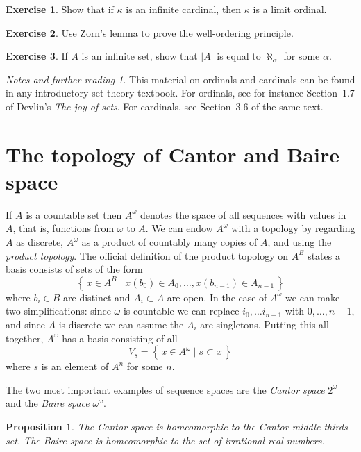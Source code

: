 \documentclass[11pt,oneside]{amsbook}
\newcommand{\set}[1]{\left\{\,#1\,\right\}}
\theoremstyle{definition}
\newtheorem{exercise}{Exercise}[section]
\theoremstyle{plain}
\newtheorem{proposition}[theorem]{Proposition}
\theoremstyle{definition}
\theoremstyle{remark}
\newtheorem*{notes}{Notes and further reading}
\numberwithin{equation}{section}
\numberwithin{figure}{section}
\begin{document}
\begin{exercise}
  Show that if $\kappa$ is an infinite cardinal, then $\kappa$ is a limit ordinal.
\end{exercise}

\begin{exercise}
  Use Zorn's lemma to prove the well-ordering principle.
\end{exercise}

\begin{exercise}
  If $A$ is an infinite set, show that $|A|$ is equal to $\aleph_\alpha$ for some $\alpha$.
\end{exercise}

\begin{notes}
  This material on ordinals and cardinals can be found in any introductory set theory textbook. For ordinals, see for instance Section~1.7 of Devlin's \emph{The joy of sets}. For cardinals, see Section~3.6 of the same text.
\end{notes}


\newpage
\section{The topology of Cantor and Baire space}

If $A$ is a countable set then $A^\omega$ denotes the space of all sequences with values in $A$, that is, functions from $\omega$ to $A$. We can endow $A^\omega$ with a topology by regarding $A$ as discrete, $A^\omega$ as a product of countably many copies of $A$, and using the \emph{product topology}. The official definition of the product topology on $A^B$ states a basis consists of sets of the form
\[\set{x\in A^B\mid x(b_0)\in A_0,\ldots,x(b_{n-1})\in A_{n-1}}
\]
where $b_i\in B$ are distinct and $A_i\subset A$ are open. In the case of $A^\omega$ we can make two simplifications: since $\omega$ is countable we can replace $i_0,\ldots i_{n-1}$ with $0,\ldots,n-1$, and since $A$ is discrete we can assume the $A_i$ are singletons. Putting this all together, $A^\omega$ has a basis consisting of all
\[V_s=\set{x\in A^\omega\mid s\subset x}
\]
where $s$ is an element of $A^n$ for some $n$.

The two most important examples of sequence spaces are the \emph{Cantor space} $2^\omega$ and the \emph{Baire space} $\omega^\omega$.

\begin{proposition}
  \label{prop:cantor-baire-homeo}
  The Cantor space is homeomorphic to the Cantor middle thirds set. The Baire space is homeomorphic to the set of irrational real numbers.
\end{proposition}
\end{document}
